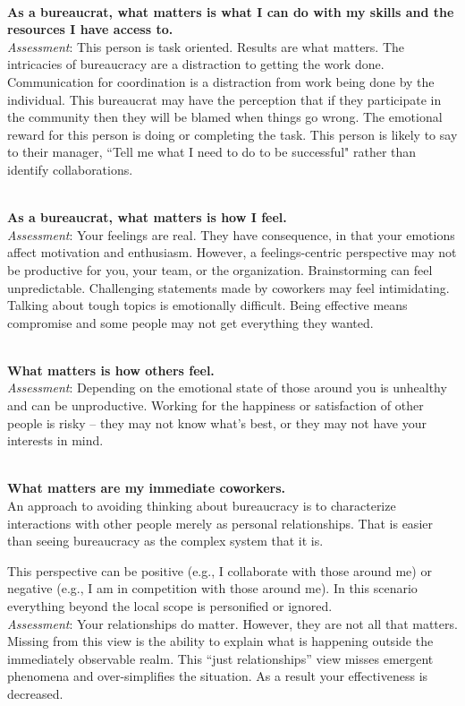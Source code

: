 \ \\
\textbf{As a bureaucrat, what matters is what I can do with my skills and the resources I have access to.} \\
\textit{Assessment}: This person is task oriented. Results are what matters. The intricacies of bureaucracy are a distraction to getting the work done. 
Communication for coordination is a distraction from work being done by the individual. 
This bureaucrat may have the perception that if they participate in the community then they will be blamed when things go wrong.
The emotional reward for this person is doing or completing the task. This person is likely to say to their manager, ``Tell me what I need to do to be successful" rather than identify collaborations.

\ \\
\textbf{As a bureaucrat, what matters is how I feel.} \\
\textit{Assessment}: Your feelings are real. They have consequence, in that your emotions affect motivation and enthusiasm. However, a feelings-centric perspective may not be productive for you, your team, or the organization. Brainstorming can feel unpredictable. Challenging statements made by coworkers may feel intimidating. Talking about tough topics is emotionally difficult. 
Being effective means compromise and some people may not get everything they wanted. %

\ \\ 
\textbf{What matters is how others feel.}\\
\textit{Assessment}: Depending on the emotional state of those around you is unhealthy and can be unproductive. Working for the happiness or satisfaction of other people is risky -- they may not know what's best, or they may not have your interests in mind.

\ \\
\textbf{What matters are my immediate coworkers.}\\
An approach to avoiding thinking about bureaucracy is to characterize interactions with other people merely as personal relationships. That is easier than seeing bureaucracy as the complex system that it is.

This perspective can be positive (e.g., I collaborate with those around me) or negative (e.g., I am in competition with those around me).
In this scenario everything beyond the local scope is personified or ignored.  \\
\textit{Assessment}: Your relationships do matter. However, they are not all that matters. Missing from this view is the ability to explain what is happening outside the immediately observable realm. 
This ``just relationships'' view misses emergent phenomena and over-simplifies the situation. As a result your effectiveness is decreased.





